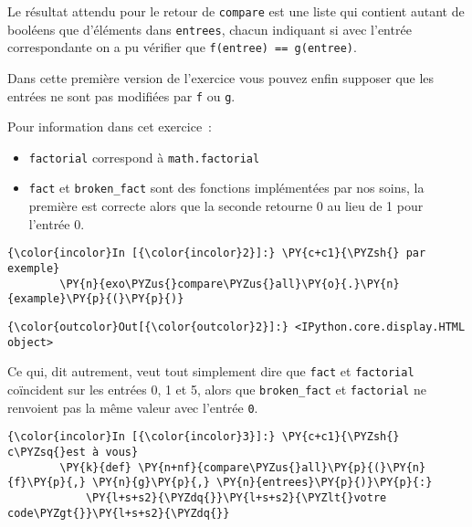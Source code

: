 Le résultat attendu pour le retour de \texttt{compare} est une liste qui
contient autant de booléens que d'éléments dans \texttt{entrees}, chacun
indiquant si avec l'entrée correspondante on a pu vérifier que
\texttt{f(entree)\ ==\ g(entree)}.

Dans cette première version de l'exercice vous pouvez enfin supposer que
les entrées ne sont pas modifiées par \texttt{f} ou \texttt{g}.

    Pour information dans cet exercice~:

\begin{itemize}
\tightlist
\item
  \texttt{factorial} correspond à \texttt{math.factorial}
\item
  \texttt{fact} et \texttt{broken\_fact} sont des fonctions implémentées
  par nos soins, la première est correcte alors que la seconde retourne
  0 au lieu de 1 pour l'entrée 0.
\end{itemize}

    \begin{Verbatim}[commandchars=\\\{\},frame=single,framerule=0.3mm,rulecolor=\color{cellframecolor}]
{\color{incolor}In [{\color{incolor}2}]:} \PY{c+c1}{\PYZsh{} par exemple}
        \PY{n}{exo\PYZus{}compare\PYZus{}all}\PY{o}{.}\PY{n}{example}\PY{p}{(}\PY{p}{)}
\end{Verbatim}


\begin{Verbatim}[commandchars=\\\{\},frame=single,framerule=0.3mm,rulecolor=\color{cellframecolor}]
{\color{outcolor}Out[{\color{outcolor}2}]:} <IPython.core.display.HTML object>
\end{Verbatim}
            
    Ce qui, dit autrement, veut tout simplement dire que \texttt{fact} et
\texttt{factorial} coïncident sur les entrées 0, 1 et 5, alors que
\texttt{broken\_fact} et \texttt{factorial} ne renvoient pas la même
valeur avec l'entrée \texttt{0}.

    \begin{Verbatim}[commandchars=\\\{\},frame=single,framerule=0.3mm,rulecolor=\color{cellframecolor}]
{\color{incolor}In [{\color{incolor}3}]:} \PY{c+c1}{\PYZsh{} c\PYZsq{}est à vous}
        \PY{k}{def} \PY{n+nf}{compare\PYZus{}all}\PY{p}{(}\PY{n}{f}\PY{p}{,} \PY{n}{g}\PY{p}{,} \PY{n}{entrees}\PY{p}{)}\PY{p}{:}
            \PY{l+s+s2}{\PYZdq{}}\PY{l+s+s2}{\PYZlt{}votre code\PYZgt{}}\PY{l+s+s2}{\PYZdq{}}
\end{Verbatim}


